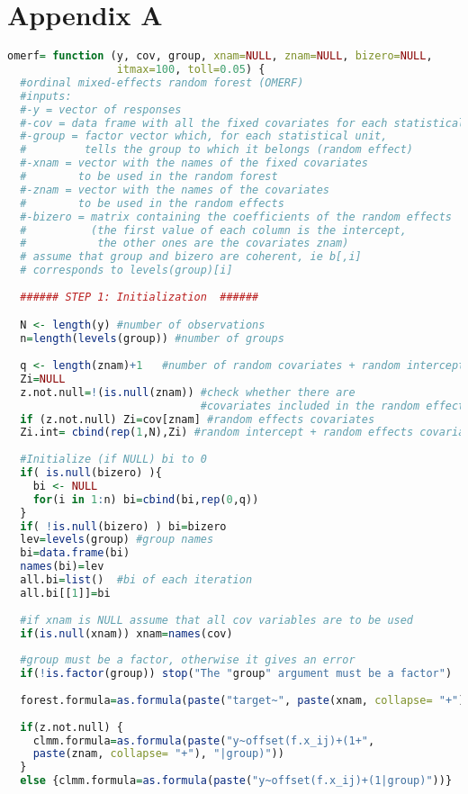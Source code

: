 \appendix
\section{Appendix A}
\label{sec:appA}

\begin{lstlisting}[language=R]
  omerf= function (y, cov, group, xnam=NULL, znam=NULL, bizero=NULL, 
                 itmax=100, toll=0.05) {
  #ordinal mixed-effects random forest (OMERF)
  #inputs: 
  #-y = vector of responses
  #-cov = data frame with all the fixed covariates for each statistical unit
  #-group = factor vector which, for each statistical unit,
  #         tells the group to which it belongs (random effect)
  #-xnam = vector with the names of the fixed covariates 
  #        to be used in the random forest
  #-znam = vector with the names of the covariates
  #        to be used in the random effects
  #-bizero = matrix containing the coefficients of the random effects
  #          (the first value of each column is the intercept,
  #           the other ones are the covariates znam)
  # assume that group and bizero are coherent, ie b[,i] 
  # corresponds to levels(group)[i]
  
  ###### STEP 1: Initialization  ######

  N <- length(y) #number of observations
  n=length(levels(group)) #number of groups
  
  q <- length(znam)+1	#number of random covariates + random intercept
  Zi=NULL
  z.not.null=!(is.null(znam)) #check whether there are 
                              #covariates included in the random effects
  if (z.not.null) Zi=cov[znam] #random effects covariates
  Zi.int= cbind(rep(1,N),Zi) #random intercept + random effects covariates
  
  #Initialize (if NULL) bi to 0
  if( is.null(bizero) ){
    bi <- NULL
    for(i in 1:n) bi=cbind(bi,rep(0,q))
  }	
  if( !is.null(bizero) ) bi=bizero
  lev=levels(group) #group names
  bi=data.frame(bi)
  names(bi)=lev
  all.bi=list()  #bi of each iteration
  all.bi[[1]]=bi
  
  #if xnam is NULL assume that all cov variables are to be used
  if(is.null(xnam)) xnam=names(cov)
  
  #group must be a factor, otherwise it gives an error
  if(!is.factor(group)) stop("The "group" argument must be a factor")
  
  forest.formula=as.formula(paste("target~", paste(xnam, collapse= "+")))
  
  if(z.not.null) {
    clmm.formula=as.formula(paste("y~offset(f.x_ij)+(1+", 
    paste(znam, collapse= "+"), "|group)"))
  }
  else {clmm.formula=as.formula(paste("y~offset(f.x_ij)+(1|group)"))}
  



\end{lstlisting}
